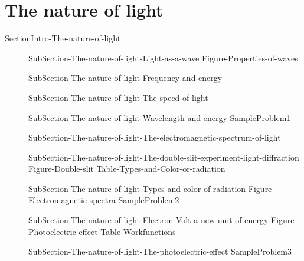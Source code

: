\documentclass[main.tex]{subfiles}
\begin{document}
\section{The nature of light}{SectionIntro-The-nature-of-light}
\sloppy
\begin{description}
\item[]{SubSection-The-nature-of-light-Light-as-a-wave}
{Figure-Properties-of-waves}
\item[] {SubSection-The-nature-of-light-Frequency-and-energy}
\item[] {SubSection-The-nature-of-light-The-speed-of-light}
\item[] {SubSection-The-nature-of-light-Wavelength-and-energy}
  {SampleProblem1}
\item[]{SubSection-The-nature-of-light-The-electromagnetic-spectrum-of-light}
  \vspace{-1cm}{Figure-Electromagnetic-field}
\item[] {SubSection-The-nature-of-light-The-double-slit-experiment-light-diffraction}
 {Figure-Double-slit}
 \vspace{1cm}\hspace{-5cm}{Figure-waves-and-life}
{Table-Types-and-Color-or-radiation}
\item[] {SubSection-The-nature-of-light-Types-and-color-of-radiation}
{Figure-Electromagnetic-spectra}
  {SampleProblem2}
\item[]{SubSection-The-nature-of-light-Electron-Volt-a-new-unit-of-energy}
{Figure-Photoelectric-effect}
{Table-Workfunctions}
\item[]{SubSection-The-nature-of-light-The-photoelectric-effect}
  {SampleProblem3}
\end{description}
\end{document}
